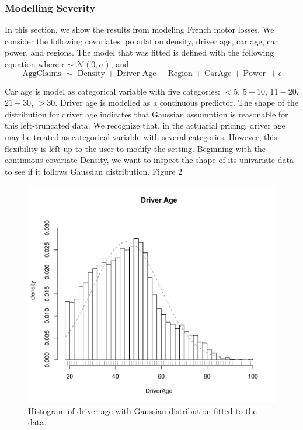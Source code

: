 \documentclass[11pt,letterpaper]{article}
\numberwithin{equation}{section}
\numberwithin{equation}{section}
\numberwithin{equation}{section}
\begin{document}
\subsubsection{Modelling Severity}
In this section, we show the results from modeling French motor losses. We consider the following covariates: population density, driver age, car age, car power, and regions. %
The model that was fitted is defined with the following equation where $\epsilon \sim \mathcal{N}(0,\sigma)$, and
$$ \text{ AggClaims } \sim  \text{ Density + Driver Age + Region + CarAge + Power }+ \epsilon.$$%

Car age is model as categorical variable with five categories: $<5$, $5-10$, $11-20$, $21-30$, $>30$. Driver age is modelled as a continuous predictor. The  shape of the distribution for driver age indicates that Gaussian assumption is reasonable for this left-truncated data. %
We recognize that, in the actuarial pricing, driver age may be treated as categorical variable with several categories. However, this flexibility is left up to the user to modify the setting. %
Beginning with the continuous covariate Density, we want to inspect the shape of its univariate data to see if it follows Gaussian distribution. %
Figure 2 %
\begin{figure}[!htb]
\begin{center}
\includegraphics[scale=0.40]{DriverAge.pdf}
\end{center}
\caption{ \label{fig:DriverAge} Histogram of driver age with Gaussian distribution fitted to the data.}
\label{fig:vet1}
\end{figure}
\end{document}
